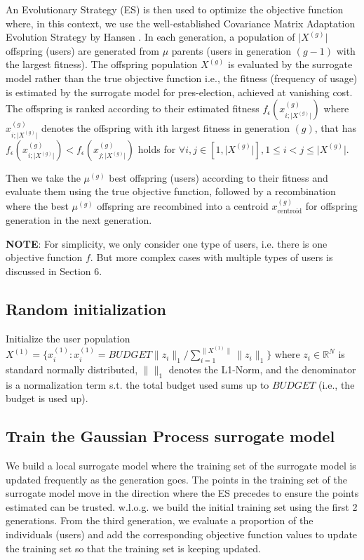 \documentclass{article}
\begin{document}
An Evolutionary Strategy (ES) is then used to optimize the objective function where, in this context, we use the well-established Covariance Matrix Adaptation Evolution Strategy by Hansen \cite{hansen2016cma}. In each generation, a population of $\vert X^{(g)} \vert$ offspring (users) are generated from $\mu$ parents (users in generation $(g-1)$ with the largest fitness). The offspring population $X^{(g)}$ is evaluated by the surrogate model rather than the true objective function i.e., the fitness (frequency of usage) is estimated by the surrogate model for pres-election, achieved at vanishing cost. The offspring is ranked according to their estimated fitness $f_\epsilon (x^{(g)}_{i;\vert X^{(g)} \vert})$ where $x^{(g)}_{i;\vert X^{(g)} \vert}$ denotes the offspring with ith largest fitness in generation $(g)$, that has $f_\epsilon(x^{(g)}_{i;\vert X^{(g)} \vert}) < f_\epsilon(x^{(g)}_{j;\vert X^{(g)} \vert})$ holds for $\forall i,j \in [1, \vert X^{(g)}\vert ],1 \leq i<j \leq \vert X^{(g)}\vert $. 

Then we take the $\mu^{(g)}$ best offspring (users) according to their fitness and evaluate them using the true objective function, followed by a recombination where the best $\mu^{(g)}$ offspring are recombined into a centroid $x_{\text{centroid}}^{(g)}$ for offspring generation in the next generation.

\textbf{NOTE}: For simplicity, we only consider one type of users, i.e. there is one objective function $f$. But more complex cases with multiple types of users is discussed in Section 6.

\subsection{ Random initialization  }
    
Initialize the user population $X^{(1)}  = \{x_i^{(1)}: x_i^{(1)}= BUDGET \|z_i\|_1 /\sum_{i=1}^{\|X^{(1)} \| } \|z_i\|_1 \}$ where $z_i \in \mathbb{R}^N $ is standard normally distributed, $\| \|_1$ denotes the L1-Norm, and the denominator is a normalization term s.t. the total budget used sums up to $BUDGET$ (i.e., the budget is used up). 
     

\subsection{Train the Gaussian Process surrogate model }  

We build a local surrogate model where the training set of the surrogate model is updated frequently as the generation goes. The points in the training set of the surrogate model move in the direction where the ES precedes to ensure the points estimated can be trusted. w.l.o.g. we build the initial training set using the first 2 generations. From the third generation, we evaluate a proportion of the individuals (users) and add the corresponding objective function values to update the training set so that the training set is keeping updated.
\end{document}
